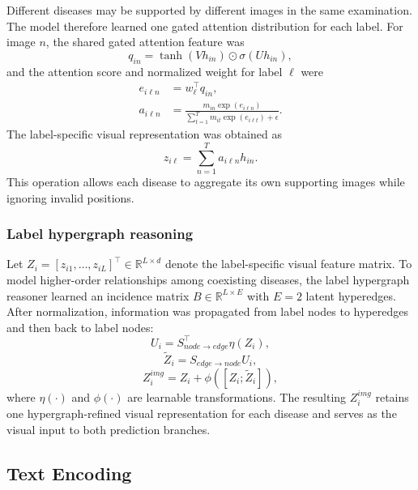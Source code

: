 \documentclass[Afour,sagev,times]{sagej}
\begin{document}
Different diseases may be supported by different images in the same examination. The model therefore learned one gated attention distribution for each label. For image $n$, the shared gated attention feature was
\begin{equation}
q_{in}=\tanh(Vh_{in})\odot\sigma(Uh_{in}),
\end{equation}
and the attention score and normalized weight for label $\ell$ were
\begin{equation}
\begin{aligned}
e_{i\ell n}&=w_{\ell}^{\top}q_{in},\\
a_{i\ell n}&=\frac{m_{in}\exp(e_{i\ell n})}
{\sum_{t=1}^{T}m_{it}\exp(e_{i\ell t})+\epsilon}.
\end{aligned}
\end{equation}
The label-specific visual representation was obtained as
\begin{equation}
z_{i\ell}=\sum_{n=1}^{T}a_{i\ell n}h_{in}.
\end{equation}
This operation allows each disease to aggregate its own supporting images while ignoring invalid positions.

\subsubsection{Label hypergraph reasoning}

Let $Z_i=[z_{i1},\ldots,z_{iL}]^{\top}\in\mathbb{R}^{L\times d}$ denote the label-specific visual feature matrix. To model higher-order relationships among coexisting diseases, the label hypergraph reasoner learned an incidence matrix $B\in\mathbb{R}^{L\times E}$ with $E=2$ latent hyperedges. After normalization, information was propagated from label nodes to hyperedges and then back to label nodes:
\begin{equation}
U_i=S_{node\rightarrow edge}^{\top}\eta(Z_i),
\end{equation}
\begin{equation}
\widetilde{Z}_i=S_{edge\rightarrow node}U_i,
\end{equation}
\begin{equation}
Z_i^{img}=Z_i+\phi([Z_i;\widetilde{Z}_i]),
\end{equation}
where $\eta(\cdot)$ and $\phi(\cdot)$ are learnable transformations. The resulting $Z_i^{img}$ retains one hypergraph-refined visual representation for each disease and serves as the visual input to both prediction branches.

\subsection{Text Encoding}
\end{document}
